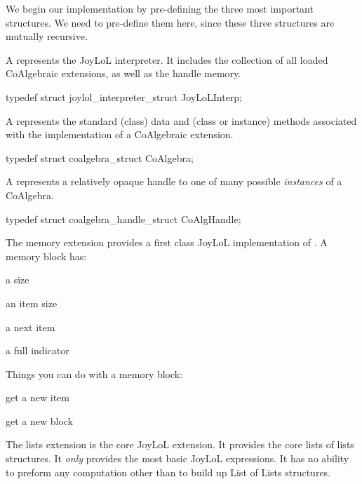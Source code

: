 We begin our implementation by pre-defining the three most important 
structures. We need to pre-define them here, since these three structures 
are mutually recursive. 

\startitemize

\item A  represents the JoyLoL interpreter. It includes 
the collection of all loaded CoAlgebraic extensions, as well as the handle 
memory. 

\startCHeader 
typedef struct joylol_interpreter_struct JoyLoLInterp;
\stopCHeader 

\item A  represents the standard (class) data and (class 
or instance) methods associated with the implementation of a CoAlgebraic 
extension. 

\startCHeader
typedef struct coalgebra_struct CoAlgebra;
\stopCHeader

\item A  represents a relatively opaque handle to one of 
many possible \emph{instances} of a CoAlgebra. 

\startCHeader
typedef struct coalgebra_handle_struct CoAlgHandle;
\stopCHeader 
\stopitemize

The memory extension provides a first class JoyLoL implementation of 
. A memory block has:

\startitemize

\item a size

\item an item size

\item a next item

\item a full indicator

\stopitemize

Things you can do with a memory block:

\startitemize

\item get a new item

\item get a new block

\stopitemize


The lists extension is the core JoyLoL extension. It provides the core 
lists of lists structures. It \emph{only} provides the most basic JoyLoL 
expressions. It has no ability to preform any computation other than to 
build up List of Lists structures. 

